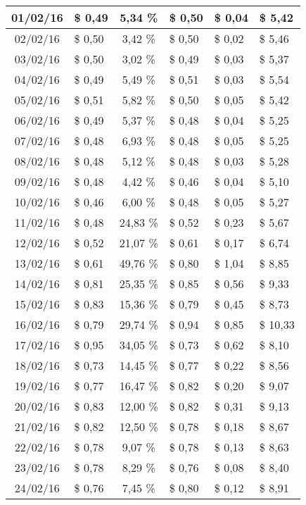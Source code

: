 \begin{center}
\begin{small}
\begin{longtable}{|c|l|c|l|l|l|}
01/02/16 & \$ 0,49 & 5,34 \% & \$ 0,50 & \$ 0,04 & \$ 5,42 \\ \hline
02/02/16 & \$ 0,50 & 3,42 \% & \$ 0,50 & \$ 0,02 & \$ 5,46 \\ \hline
03/02/16 & \$ 0,50 & 3,02 \% & \$ 0,49 & \$ 0,03 & \$ 5,37 \\ \hline
04/02/16 & \$ 0,49 & 5,49 \% & \$ 0,51 & \$ 0,03 & \$ 5,54 \\ \hline
05/02/16 & \$ 0,51 & 5,82 \% & \$ 0,50 & \$ 0,05 & \$ 5,42 \\ \hline
06/02/16 & \$ 0,49 & 5,37 \% & \$ 0,48 & \$ 0,04 & \$ 5,25 \\ \hline
07/02/16 & \$ 0,48 & 6,93 \% & \$ 0,48 & \$ 0,05 & \$ 5,25 \\ \hline
08/02/16 & \$ 0,48 & 5,12 \% & \$ 0,48 & \$ 0,03 & \$ 5,28 \\ \hline
09/02/16 & \$ 0,48 & 4,42 \% & \$ 0,46 & \$ 0,04 & \$ 5,10 \\ \hline
10/02/16 & \$ 0,46 & 6,00 \% & \$ 0,48 & \$ 0,05 & \$ 5,27 \\ \hline
11/02/16 & \$ 0,48 & 24,83 \% & \$ 0,52 & \$ 0,23 & \$ 5,67 \\ \hline
12/02/16 & \$ 0,52 & 21,07 \% & \$ 0,61 & \$ 0,17 & \$ 6,74 \\ \hline
13/02/16 & \$ 0,61 & 49,76 \% & \$ 0,80 & \$ 1,04 & \$ 8,85 \\ \hline
14/02/16 & \$ 0,81 & 25,35 \% & \$ 0,85 & \$ 0,56 & \$ 9,33 \\ \hline
15/02/16 & \$ 0,83 & 15,36 \% & \$ 0,79 & \$ 0,45 & \$ 8,73 \\ \hline
16/02/16 & \$ 0,79 & 29,74 \% & \$ 0,94 & \$ 0,85 & \$ 10,33 \\ \hline
17/02/16 & \$ 0,95 & 34,05 \% & \$ 0,73 & \$ 0,62 & \$ 8,10 \\ \hline
18/02/16 & \$ 0,73 & 14,45 \% & \$ 0,77 & \$ 0,22 & \$ 8,56 \\ \hline
19/02/16 & \$ 0,77 & 16,47 \% & \$ 0,82 & \$ 0,20 & \$ 9,07 \\ \hline
20/02/16 & \$ 0,83 & 12,00 \% & \$ 0,82 & \$ 0,31 & \$ 9,13 \\ \hline
21/02/16 & \$ 0,82 & 12,50 \% & \$ 0,78 & \$ 0,18 & \$ 8,67 \\ \hline
22/02/16 & \$ 0,78 & 9,07 \% & \$ 0,78 & \$ 0,13 & \$ 8,63 \\ \hline
23/02/16 & \$ 0,78 & 8,29 \% & \$ 0,76 & \$ 0,08 & \$ 8,40 \\ \hline
24/02/16 & \$ 0,76 & 7,45 \% & \$ 0,80 & \$ 0,12 & \$ 8,91 \\ \hline

\end{longtable}
\end{small}
\end{center}
